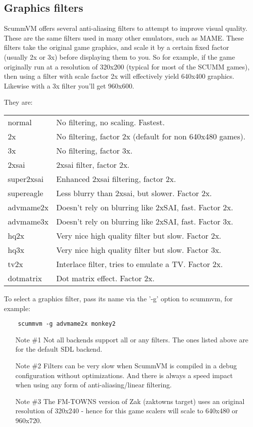 

\subsection {Graphics filters}
ScummVM offers several anti-aliasing filters to attempt to improve visual
quality. These are the same filters used in many other emulators, such as
MAME. These filters take the original game graphics, and scale it by a 
certain fixed factor (usually 2x or 3x) before displaying them to you.
So for example, if the game originally run at a resolution of 320x200
(typical for most of the SCUMM games), then using a filter with scale
factor 2x will effectively yield 640x400 graphics. Likewise with a 
3x filter you'll get 960x600.

They are:\\
\begin{tabular}[h]{ll}
  normal     & No filtering, no scaling. Fastest.\\
  2x         & No filtering, factor 2x (default for non 640x480 games).\\
  3x         & No filtering, factor 3x.\\
  2xsai      & 2xsai filter, factor 2x.\\
  super2xsai & Enhanced 2xsai filtering, factor 2x.\\
  supereagle & Less blurry than 2xsai, but slower. Factor 2x.\\
  advmame2x  & Doesn't rely on blurring like 2xSAI, fast. Factor 2x.\\
  advmame3x  & Doesn't rely on blurring like 2xSAI, fast. Factor 3x.\\
  hq2x       & Very nice high quality filter but slow. Factor 2x.\\
  hq3x       & Very nice high quality filter but slow. Factor 3x.\\
  tv2x       & Interlace filter, tries to emulate a TV. Factor 2x.\\
  dotmatrix  & Dot matrix effect. Factor 2x.\\
\end{tabular}

To select a graphics filter, pass its name via the '-g' option to scummvm,
for example:

\begin{verbatim}
    scummvm -g advmame2x monkey2
\end{verbatim}
\begin{enumerate}
\item [Note \#1] Not all backends support all or any filters. The ones
  listed above are for the default SDL backend.
\item [Note \#2] Filters can be very slow when ScummVM is compiled in a
  debug configuration without optimizations. And there is always a
  speed impact when using any form of anti-aliasing/linear filtering.
\item [Note \#3] The FM-TOWNS version of Zak (zaktowns target) uses an
  original resolution of 320x240 - hence for this game scalers will
  scale to 640x480 or 960x720.
\end{enumerate}
